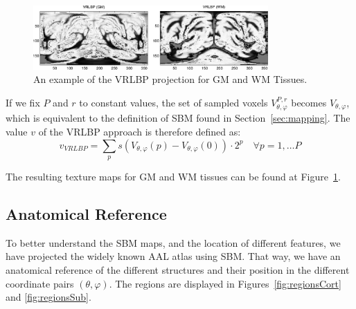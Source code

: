 \begin{figure}[t]
	\myfloatalign
	\includegraphics[width=0.8\textwidth]{Graphics/ch6/04-vrlbp}
	\caption{An example of the \acs{VRLBP} projection for \acs{GM} and \acs{WM} Tissues. }
	\label{fig:vrlbp}
\end{figure}

If we fix $P$ and $r$ to constant values, the set of sampled voxels $V_{\theta,\varphi}^{P,r}$ becomes $V_{\theta,\varphi}$, which is equivalent to the definition of \ac{SBM} found in Section~\ref{sec:mapping}. The value $v$ of the \ac{VRLBP} approach is therefore defined as: 
\begin{equation}
v_{VRLBP} = \sum_{p} s(V_{\theta,\varphi}(p)-V_{\theta,\varphi}(0))\cdot 2^{p} \quad \forall p=1,\dots P
\end{equation}

The resulting texture maps for \ac{GM} and \ac{WM} tissues can be found at Figure~\ref{fig:vrlbp}. 


%	
%	

\subsection{Anatomical Reference}\label{sec:anatomical}
To better understand the \ac{SBM} maps, and the location of different features, we have projected the widely known \ac{AAL} atlas \cite{Tzourio-Mazoyer2002} using \ac{SBM}. That way, we have an anatomical reference of the different structures and their position in the different coordinate pairs $(\theta,\varphi)$. The regions are displayed in  Figures~\ref{fig:regionsCort} and \ref{fig:regionsSub}. 

